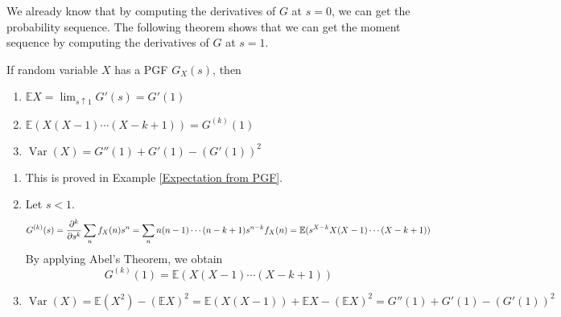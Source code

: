 \documentclass{huhtakm-template-book}
\newcommand{\expect}{\mathbb{E}}
\DeclareMathOperator{\Var}{Var}
\begin{document}
We already know that by computing the derivatives of $G$ at $s=0$, we can get the probability sequence. The following theorem shows that we can get the moment sequence by computing the derivatives of $G$ at $s=1$.
\begin{thm}
    If random variable $X$ has a PGF $G_{X}(s)$, then
    \begin{enumerate}
        \item $\expect X=\lim_{s\uparrow 1}G'(s)=G'(1)$
        \item $\expect(X(X-1)\cdots(X-k+1))=G^{(k)}(1)$
        \item $\Var(X)=G''(1)+G'(1)-(G'(1))^{2}$
    \end{enumerate}
\end{thm}
\begin{proofing}
    \begin{enumerate}
        \item This is proved in Example \ref{Expectation from PGF}.
        \item Let $s<1$.
        \begin{equation*}
            G^{(k)}(s)=\pdv*[order={k}]{\sum_{n}f_{X}(n)s^{n}}{s}=\sum_{n}n(n-1)\cdots(n-k+1)s^{n-k}f_{X}(n)=\expect(s^{X-k}X(X-1)\cdots(X-k+1))
        \end{equation*}
        By applying Abel's Theorem, we obtain
        \begin{equation*}
            G^{(k)}(1)=\expect(X(X-1)\cdots(X-k+1))
        \end{equation*}
        \item 
        \begin{equation*}
            \Var(X)=\expect(X^{2})-(\expect X)^{2}=\expect(X(X-1))+\expect X-(\expect X)^{2}=G''(1)+G'(1)-(G'(1))^{2}
        \end{equation*}
    \end{enumerate}
\end{proofing}
\end{document}
